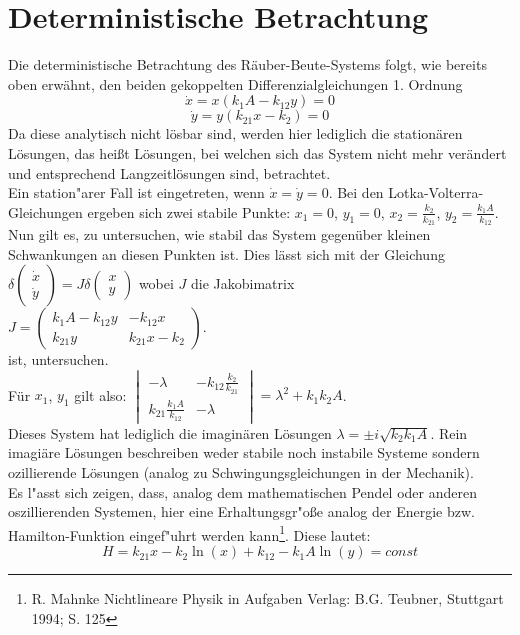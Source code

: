 \documentclass[11pt]{article}
\begin{document}
\section{Deterministische Betrachtung}
Die deterministische Betrachtung des Räuber-Beute-Systems folgt, wie bereits oben erwähnt, den beiden gekoppelten Differenzialgleichungen 1. Ordnung
$$\dot x=x(k_1 A-k_{12}y)=0$$
$$\dot y=y(k_{21}x-k_2)=0$$
Da diese analytisch nicht lösbar sind, werden hier lediglich die stationären Lösungen, das heißt Lösungen, bei welchen sich das System nicht mehr verändert und entsprechend Langzeitlösungen sind, betrachtet.\\
Ein station"arer Fall ist eingetreten, wenn  $\dot x=\dot y=0$. Bei den Lotka-Volterra-Gleichungen ergeben sich zwei stabile Punkte: 
 $x_1=0$, $y_1=0$, $x_2=\frac{k_2}{k_{21}}$, $y_2=\frac{k_1 A}{k_{12}}$.\\
Nun gilt es, zu untersuchen, wie stabil das System gegenüber kleinen Schwankungen an diesen Punkten ist. Dies lässt sich mit der Gleichung
$\delta \begin{pmatrix} \dot x \\ \dot y \end{pmatrix}=J\delta \begin{pmatrix} x \\ y \end{pmatrix}$ wobei $J$ die Jakobimatrix\\
$J=\begin{pmatrix} k_1A-k_{12}y & -k_{12}x \\ k_{21}y & k_{21}x-k_2 \end{pmatrix}$.\vspace{3mm} \\
ist, untersuchen.\\
Für $x_1$, $y_1$ gilt also:
$\begin{vmatrix} -\lambda & -k_{12}\frac{k_2}{k_21} \\ k_{21}\frac{k_1 A}{k_12} & -\lambda \end{vmatrix}=\lambda^2+k_1k_2A$.\\
Dieses System hat lediglich die imaginären Lösungen $\lambda=\pm i\sqrt{k_2k_1A}$. Rein imagiäre Lösungen beschreiben weder stabile noch instabile Systeme sondern ozillierende Lösungen (analog zu Schwingungsgleichungen in der Mechanik).\\
Es l"asst sich zeigen, dass, analog dem mathematischen Pendel oder anderen oszillierenden Systemen, hier eine Erhaltungsgr"o\ss e analog der Energie bzw. Hamilton-Funktion eingef"uhrt werden kann\footnote{R. Mahnke \glqq Nichtlineare Physik in Aufgaben \grqq Verlag: B.G. Teubner, Stuttgart 1994; S. 125}. Diese lautet:
$$H=k_{21}x-k_2\ln(x)+k_{12}-k_1A\ln(y)=const$$
\end{document}

